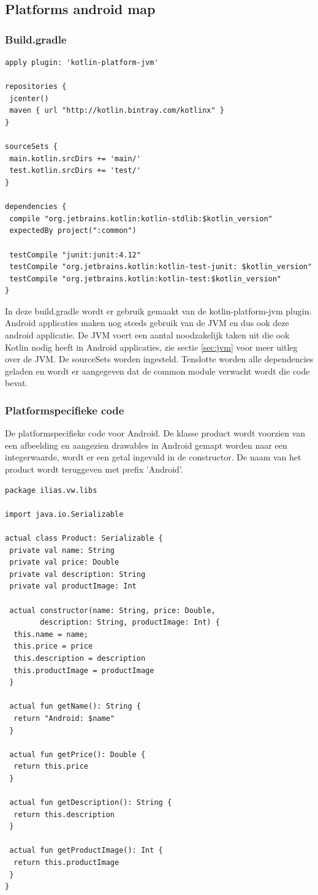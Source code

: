 \subsection{Platforms android map}
\subsubsection{Build.gradle}
\begin{lstlisting}
apply plugin: 'kotlin-platform-jvm'

repositories {
 jcenter()
 maven { url "http://kotlin.bintray.com/kotlinx" }
}

sourceSets {
 main.kotlin.srcDirs += 'main/'
 test.kotlin.srcDirs += 'test/'
}

dependencies {
 compile "org.jetbrains.kotlin:kotlin-stdlib:$kotlin_version"
 expectedBy project(":common")

 testCompile "junit:junit:4.12"
 testCompile "org.jetbrains.kotlin:kotlin-test-junit: $kotlin_version"
 testCompile "org.jetbrains.kotlin:kotlin-test:$kotlin_version"
}
\end{lstlisting}

In deze build.gradle wordt er gebruik gemaakt van de kotlin-platform-jvm plugin. Android applicaties maken nog steeds gebruik van de JVM en dus ook deze android applicatie. De JVM voert een aantal noodzakelijk taken uit die ook Kotlin nodig heeft in Android applicaties, zie sectie \ref{sec:jvm} voor meer uitleg over de JVM. De sourceSets worden ingesteld. Tenslotte worden alle dependencies geladen en wordt er aangegeven dat de common module verwacht wordt die code bevat.

\subsubsection{Platformspecifieke code}
De platformspecifieke code voor Android. De klasse product wordt voorzien van een afbeelding en aangezien drawables in Android gemapt worden naar een integerwaarde, wordt er een getal ingevuld in de constructor. De naam van het product wordt teruggeven met prefix 'Android'.
\begin{lstlisting}
package ilias.vw.libs

import java.io.Serializable

actual class Product: Serializable {
 private val name: String
 private val price: Double
 private val description: String
 private val productImage: Int

 actual constructor(name: String, price: Double, 
		description: String, productImage: Int) {
  this.name = name;
  this.price = price
  this.description = description
  this.productImage = productImage
 }

 actual fun getName(): String {
  return "Android: $name"
 }

 actual fun getPrice(): Double {
  return this.price
 }

 actual fun getDescription(): String {
  return this.description
 }

 actual fun getProductImage(): Int {
  return this.productImage
 }
}
\end{lstlisting}

